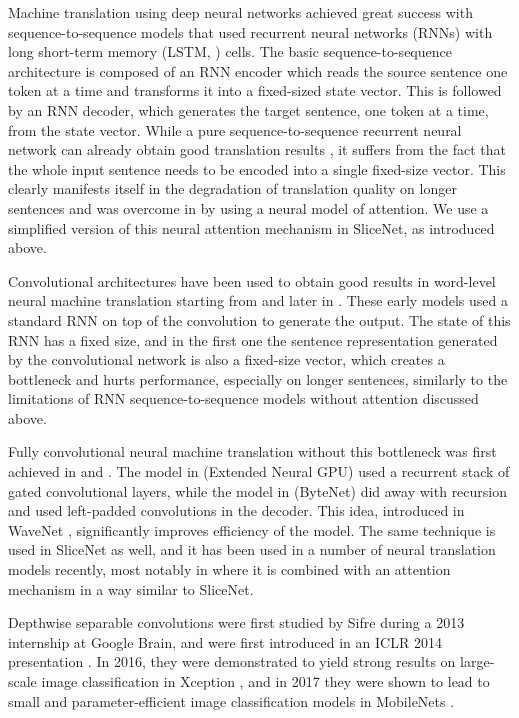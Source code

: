 \documentclass{article}
\begin{document}
Machine translation using deep neural networks achieved great success with
sequence-to-sequence models \cite{sutskever14,bahdanau2014neural,cho2014learning}
that used recurrent neural networks (RNNs) with long short-term memory
(LSTM, \cite{hochreiter1997}) cells. The basic sequence-to-sequence architecture
is composed of an RNN encoder which reads the source sentence
one token at a time and transforms it into a fixed-sized state vector.
This is followed by an RNN decoder, which generates the target sentence,
one token at a time, from the state vector.
While a pure sequence-to-sequence recurrent neural network can already
obtain good translation results \cite{sutskever14,cho2014learning},
it suffers from the fact that the whole input sentence
needs to be encoded into a single fixed-size vector. This clearly
manifests itself in the degradation of translation quality
on longer sentences and was overcome in \cite{bahdanau2014neural}
by using a neural model of attention. We use a simplified version
of this neural attention mechanism in SliceNet, as introduced above.

Convolutional architectures have been used to obtain good results in word-level
neural machine translation starting from \cite{KalchbrennerB13} and later in
\cite{MengLWLJL15}. These early models used a standard RNN on top of
the convolution to generate the output. The state of this RNN has a fixed size,
and in the first one the sentence representation generated by the convolutional
network is also a fixed-size vector, which creates a bottleneck and hurts
performance, especially on longer sentences, similarly to  the limitations of RNN
sequence-to-sequence models without attention \cite{sutskever14,cho2014learning}
discussed above.

Fully convolutional neural machine translation without this bottleneck
was first achieved in \cite{extendedngpu} and \cite{bytenet2016}.
The model in \cite{extendedngpu} (Extended Neural GPU) used a recurrent stack
of gated convolutional layers, while the model in \cite{bytenet2016} (ByteNet)
did away with recursion and used left-padded convolutions in the decoder.
This idea, introduced in WaveNet \cite{wavenet2016}, significantly improves
efficiency of the model. The same technique is used in SliceNet as well, and it has been used
in a number of neural translation models recently, most notably in \cite{fbpaper}
where it is combined with an attention mechanism in a way similar to SliceNet.

Depthwise separable convolutions were first studied by Sifre \cite{sifre2013}
during a 2013 internship at Google Brain, and were first introduced
in an ICLR 2014 presentation \cite{vanhoucke-iclr14}.
In 2016, they were demonstrated to yield strong results on large-scale image classification
in Xception \cite{xception2016}, and in 2017 they were shown to lead to small and
parameter-efficient image classification models in MobileNets \cite{mobilenets2017}.
\end{document}
